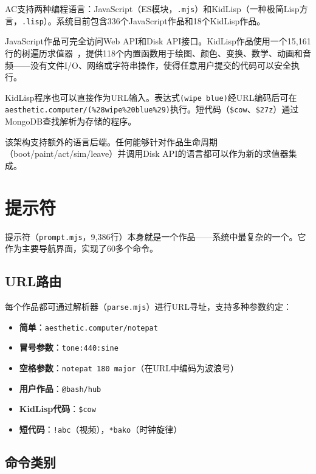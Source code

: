 \documentclass[10pt,letterpaper,twocolumn]{article}
\begin{document}
AC支持两种编程语言：JavaScript（ES模块，\texttt{.mjs}）和KidLisp（一种极简Lisp方言，\texttt{.lisp}）。系统目前包含336个JavaScript作品和18个KidLisp作品。

JavaScript作品可完全访问Web API和Disk API接口。KidLisp作品使用一个15,161行的树遍历求值器~\citep{scudder2026kidlisp}，提供118个内置函数用于绘图、颜色、变换、数学、动画和音频——没有文件I/O、网络或字符串操作，使得任意用户提交的代码可以安全执行。

KidLisp程序也可以直接作为URL输入。表达式\texttt{(wipe blue)}经URL编码后可在\texttt{aesthetic.computer/(\%28wipe\%20blue\%29)}执行。短代码（\texttt{\$cow}、\texttt{\$27z}）通过MongoDB查找解析为存储的程序。

该架构支持额外的语言后端。任何能够针对作品生命周期（boot/paint/act/sim/leave）并调用Disk API的语言都可以作为新的求值器集成。


\section{提示符}
\label{sec:prompt}

提示符（\texttt{prompt.mjs}，9,386行）本身就是一个作品——系统中最复杂的一个。它作为主要导航界面，实现了60多个命令。

\subsection{URL路由}

每个作品都可通过解析器（\texttt{parse.mjs}）进行URL寻址，支持多种参数约定：

\begin{itemize}
  \item \textbf{简单}：\texttt{aesthetic.computer/notepat}
  \item \textbf{冒号参数}：\texttt{tone:440:sine}
  \item \textbf{空格参数}：\texttt{notepat 180 major}（在URL中编码为波浪号）
  \item \textbf{用户作品}：\texttt{@bash/hub}
  \item \textbf{KidLisp代码}：\texttt{\$cow}
  \item \textbf{短代码}：\texttt{!abc}（视频），\texttt{*bako}（时钟旋律）
\end{itemize}

\subsection{命令类别}
\end{document}

